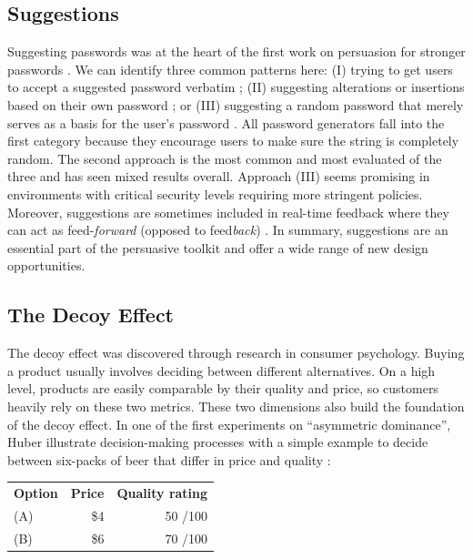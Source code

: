 \subsection{Suggestions}
Suggesting passwords was at the heart of the first work on persuasion for stronger passwords \cite{Forget2008ImprovingPasswordsThroughPersuasion}. We can identify three common patterns here: (I) trying to get users to accept a suggested password verbatim \cite{Vance2013FearAppeals}; (II) suggesting alterations or insertions based on their own password \cite{Forget2008ImprovingPasswordsThroughPersuasion,Segreti2017AdaptivePolicies, Shay2015SpoonfulOfSugar}; or (III) suggesting a random password that merely serves as a basis for the user's password \cite{Huha2015UserReplaceablePasswords}. All password generators fall into the first category because they encourage users to make sure the string is completely random. The second approach is the most common and most evaluated of the three and has seen mixed results overall. Approach (III) seems promising in environments with critical security levels requiring more stringent policies. Moreover, suggestions are sometimes included in real-time feedback where they can act as feed-\textit{forward} (opposed to feed\textit{back}) \cite{Ur2017DataDrivenPWMeter}. In summary, suggestions are an essential part of the persuasive toolkit and offer a wide range of new design opportunities.

\subsection{The Decoy Effect}
The decoy effect was discovered through research in consumer psychology. Buying a product usually involves deciding between different alternatives. On a high level, products are easily comparable by their quality and price, so customers heavily rely on these two metrics. These two dimensions also build the foundation of the decoy effect. In one of the first experiments on ``asymmetric dominance'', Huber \etal illustrate decision-making processes with a simple example to decide between six-packs of beer that differ in price and quality \cite[slightly adapted for simplicity]{Huber1982AsymetricallyDominated}: 
\begin{table}[!h]
\begin{tabular}{lrr}
	\textbf{Option} & \textbf{Price} & \textbf{Quality rating}\\
	(A) & \$4 & 50 \small{/100}\\
	(B) & \$6 & 70 \small{/100}\\
\end{tabular}
\end{table}

